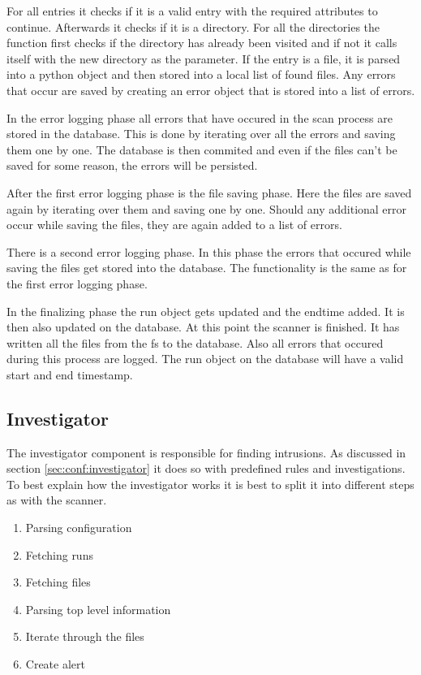 For all entries it checks if it is a valid entry with the required attributes to continue. Afterwards it checks if it is a directory. For all the directories the function first checks if the directory has already been visited and if not it calls itself with the new directory as the parameter. If the entry is a file, it is parsed into a python object and then stored into a local list of found files. Any errors that occur are saved by creating an error object that is stored into a list of errors.

In the error logging phase all errors that have occured in the scan process are stored in the database. This is done by iterating over all the errors and saving them one by one. The database is then commited and even if the files can't be saved for some reason, the errors will be persisted.

After the first error logging phase is the file saving phase. Here the files are saved again by iterating over them and saving one by one. Should any additional error occur while saving the files, they are again added to a list of errors. 

There is a second error logging phase. In this phase the errors that occured while saving the files get stored into the database. The functionality is the same as for the first error logging phase.

In the finalizing phase the run object gets updated and the endtime added. It is then also updated on the database. At this point the scanner is finished. It has written all the files from the \gls{fs} to the database. Also all errors that occured during this process are logged. The run object on the database will have a valid start and end timestamp. 


\subsection{Investigator}
\label{sec:Investigator}

The investigator component is responsible for finding intrusions. As discussed in section \ref{sec:conf:investigator} it does so with predefined rules and investigations. To best explain how the investigator works it is best to split it into different steps as with the scanner.

\begin{enumerate}
	\item Parsing configuration
	\item Fetching runs
	\item Fetching files
	\item Parsing top level information
	\item Iterate through the files
	\item Create alert
\end{enumerate}

